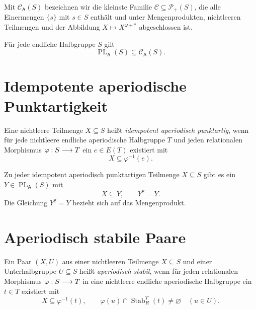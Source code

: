 \begin{definition}
\label{def:b37-guide-aperiodic-closure}
Mit $\mathcal C_{\mathsf A}(S)$ bezeichnen wir die kleinste Familie
$\mathcal C\subseteq\mathcal P_+(S)$, die alle Einermengen
$\{s\}$ mit $s\in S$ enthält und unter Mengenprodukten, nichtleeren
Teilmengen und der Abbildung $X\mapsto X^{\omega+*}$ abgeschlossen ist.
\end{definition}

\begin{theorem}
\label{thm:b37-guide-aperiodic-pointlikes}
Für jede endliche Halbgruppe $S$ gilt
\[
 \operatorname{PL}_{\mathsf A}(S)\subseteq\mathcal C_{\mathsf A}(S).
\]
\cite{Henckell1988,VanGoolSteinberg2019}
\end{theorem}

\section{Idempotente aperiodische Punktartigkeit}

\begin{definition}
Eine nichtleere Teilmenge $X\subseteq S$ heißt
\emph{idempotent aperiodisch punktartig}, wenn für jede nichtleere
endliche aperiodische Halbgruppe $T$ und jeden relationalen Morphismus
$\varphi:S\relbar\joinrel\to T$ ein $e\in E(T)$ existiert mit
\[
 X\subseteq\varphi^{-1}(e).
\]
\end{definition}

\begin{theorem}
\label{thm:b37-guide-idempotent-pointlikes}
Zu jeder idempotent aperiodisch punktartigen Teilmenge $X\subseteq S$
gibt es ein $Y\in\operatorname{PL}_{\mathsf A}(S)$ mit
\[
 X\subseteq Y,\qquad Y^2=Y.
\]
Die Gleichung $Y^2=Y$ bezieht sich auf das Mengenprodukt.
\cite{Henckell2004,HenckellRhodesSteinberg2010StablePairs}
\end{theorem}

\section{Aperiodisch stabile Paare}

\begin{definition}
Ein Paar $(X,U)$ aus einer nichtleeren Teilmenge $X\subseteq S$
und einer Unterhalbgruppe $U\subseteq S$ heißt \emph{aperiodisch stabil},
wenn für jeden relationalen Morphismus
$\varphi:S\relbar\joinrel\to T$ in eine nichtleere endliche
aperiodische Halbgruppe ein $t\in T$ existiert mit
\[
 X\subseteq\varphi^{-1}(t),\qquad
 \varphi(u)\cap\operatorname{Stab}_{R}^{T}(t)\ne\varnothing
 \quad(u\in U).
\]
\end{definition}


